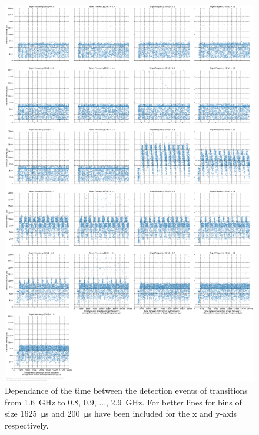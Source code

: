 \begin{figure}[]
    \centering
    \includegraphics[width=\columnwidth]{fig/ftalat/ftalat_scatter_wait_transition_latency_hati_source_1.6.pdf}
    \caption{Dependance of the time between the detection events of transitions from \SI{1.6}{\GHz} to \SI{0.8}{}, \SI{0.9}{}, ..., \SI{2.9}{\GHz}. For better lines for bins of size \SI{1625}{\us} and \SI{200}{\us} have been included for the x and y-axis respectively.}
\end{figure}
